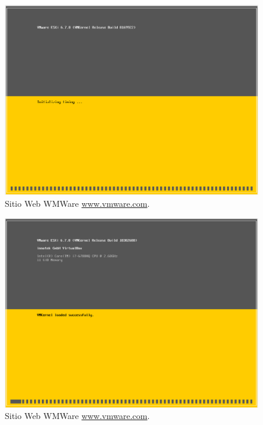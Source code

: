 \begin{figure}[!hbtp]
	\centering
	\includegraphics[width=\linewidth]{RE01_VMwareESXi/RE_VMwareInstalacion03.png}
	\vspace{-0.2cm}
	\caption{Sitio Web WMWare \url{www.vmware.com}.\footnotemark[2]{} }
	\label{fig:VMwareInstalacion03}
\end{figure}

\begin{figure}[!hbtp]
	\centering
	\includegraphics[width=\linewidth]{RE01_VMwareESXi/RE_VMwareInstalacion04.png}
	\vspace{-0.2cm}
	\caption{Sitio Web WMWare \url{www.vmware.com}.\footnotemark[2]{} }
	\label{fig:VMwareInstalacion04}
\end{figure}

